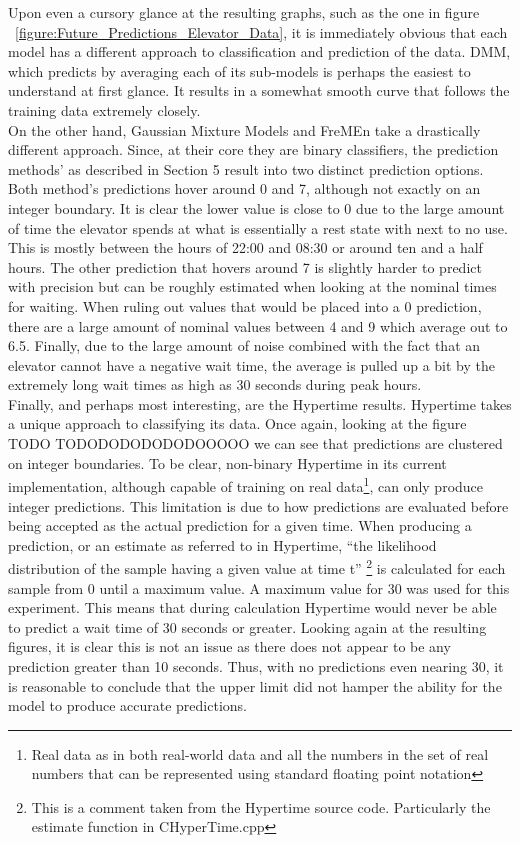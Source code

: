 \begin{center}
Upon even a cursory glance at the resulting graphs, such as the one in figure
~\ref{figure:Future_Predictions_Elevator_Data}, it is immediately
obvious that each model has a different approach to classification and
prediction of the data. DMM, which predicts by
averaging each of its sub-models is perhaps the easiest to understand at first
glance. It results in a somewhat smooth curve that follows the training data
extremely closely. \\

On the other hand, Gaussian Mixture Models and FreMEn take a drastically
different approach. Since, at their core they are binary classifiers, the
prediction methods' as described in Section 5 result into two distinct
prediction options. Both method's predictions hover around 0 and 7, although
not exactly on an integer boundary. It is clear the lower value is close to 0
due to the large amount of time the elevator spends at what is essentially a
rest state with next to no use. This is mostly between the hours of 22:00 and
08:30 or around ten and a half hours. The other prediction that hovers around 7
is slightly harder to predict with precision but can be roughly estimated when
looking at the nominal times for waiting. When ruling out values that would be
placed into a 0 prediction, there are a large amount of nominal values between 4
and 9 which average out to 6.5. Finally, due to the large amount of noise
combined with the fact that an elevator cannot have a negative wait time,
the average is pulled up a bit by the extremely long wait times as high as 30 seconds during peak hours. \\

Finally, and perhaps most interesting, are the Hypertime results. Hypertime takes a
unique approach to classifying its data. Once again, looking at the figure TODO TODODODODODODOOOOO
we can see that predictions are clustered on integer boundaries. To be clear,
non-binary Hypertime in its current implementation, although capable of training
on real data\footnote[1]{Real data as in both real-world data and all the numbers in the set of real numbers that can be represented using standard floating point notation},
can only produce
integer predictions. This limitation is due to how predictions are evaluated
before being accepted as the actual prediction for a given time.
When producing a prediction, or an
estimate as referred to in Hypertime, ``the likelihood distribution of the
sample having a given value at time t''
\footnote[2]{This is a comment taken from the Hypertime source code. Particularly the estimate function in CHyperTime.cpp}
is calculated
for each sample from 0 until a maximum value. A maximum value for 30 was used
for this experiment. This means that during calculation Hypertime would never
be able to predict a wait time of 30 seconds or greater. Looking again at the
resulting figures, it is clear this is not an issue as there does not appear to
be any prediction greater than 10 seconds. Thus, with no predictions even
nearing 30, it is reasonable to conclude that the upper limit did not hamper the ability for
the model to produce accurate predictions. \\


\end{center}
